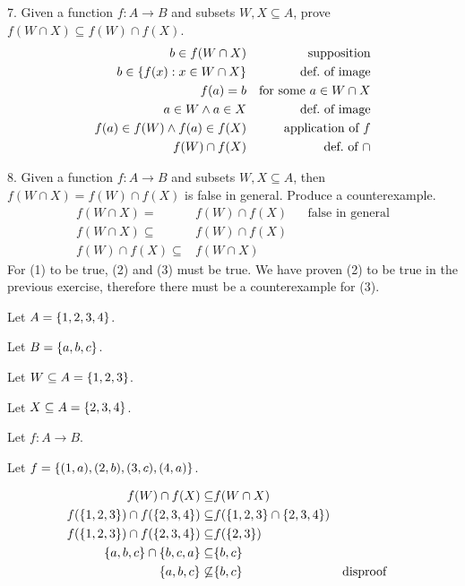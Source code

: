 \documentclass{article}
\begin{document}
\begin{exercise}{}{}
	{7. Given a function $f: A \rightarrow B$ and subsets $W, X \subseteq A$, prove $f(W \cap X) \subseteq f(W) \cap f(X)$.}
	\begin{align*}
		b\in f(W\cap X)                   &  & \text{supposition}           \\
		b\in \{f(x): x \in W\cap X\}    &  & \text{def.\ of image}        \\
		f(a) = b                          &  & \text{for some }a\in W\cap X \\
		a \in W \land a \in X             &  & \text{def.\ of image}        \\
		f(a) \in f(W) \land f(a) \in f(X) &  & \text{application of }f      \\
		f(W) \cap f(X)                    &  & \text{def.\ of }\cap
	\end{align*}
\end{exercise}{}{}

\begin{exercise}{}{}
	{8. Given a function $f: A \rightarrow B$ and subsets $W, X \subseteq A$,
		then $f(W \cap X)=f(W) \cap f(X)$ is false in general. Produce a
		counterexample.}
	\begin{align}
		f(W \cap X)=             & f(W) \cap f(X) &  & \text{false in general} \\
		f(W \cap X)\subseteq     & f(W) \cap f(X)                              \\
		f(W) \cap f(X) \subseteq & f(W \cap X)
	\end{align}
	For (1) to be true, (2) and (3) must be true. We have proven (2) to be true in
	the previous exercise, therefore there must be a counterexample for (3).
	\begin{alist}
		\item Let $A=\{1, 2, 3, 4\}$.
		\item Let $B=\{a, b, c\}$.
		\item Let $W\subseteq A = \{1, 2, 3\}$.
		\item Let $X\subseteq A = \{2, 3, 4\}$.
		\item Let $f: A \rightarrow B$.
		\item Let $f = \{(1, a), (2, b), (3, c), (4, a)\}$.
	\end{alist}
	\begin{align*}
		f(W) \cap f(X) \subseteq                         & f(W \cap X)                                              \\
		f(\{1, 2, 3\}) \cap f(\{2, 3, 4\}) \subseteq & f(\{1, 2, 3\} \cap \{2, 3, 4\})                      \\
		f(\{1, 2, 3\}) \cap f(\{2, 3, 4\}) \subseteq & f(\{2, 3\})                                            \\
		\{a, b, c\} \cap \{b, c, a\} \subseteq       & \{b, c\}                                               \\
		\{a, b, c\} \not\subseteq                      & \{b, c\}                          &  & \text{disproof}
	\end{align*}
\end{exercise}{}{}
\end{document}
